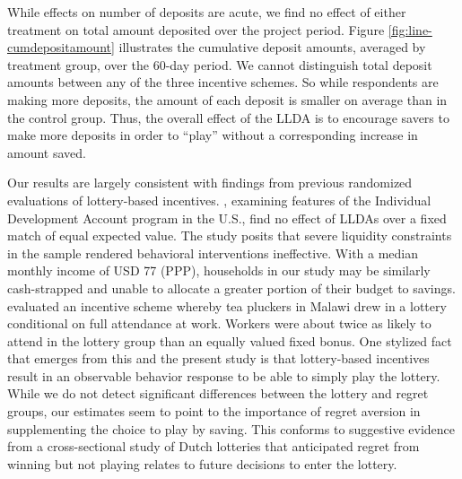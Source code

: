 \documentclass[10pt]{article}
\begin{document}
		While effects on number of deposits are acute, we find no effect of either treatment on total amount deposited over the project period. Figure \ref{fig:line-cumdepositamount} illustrates the cumulative deposit amounts, averaged by treatment group, over the 60-day period. We cannot distinguish total deposit amounts between any of the three incentive schemes. So while respondents are making more deposits, the amount of each deposit is smaller on average than in the control group. Thus, the overall effect of the LLDA is to encourage savers to make more deposits in order to ``play'' without a corresponding increase in amount saved.

		Our results are largely consistent with findings from previous randomized evaluations of lottery-based incentives. , examining features of the Individual Development Account program in the U.S., find no effect of LLDAs over a fixed match of equal expected value. The study posits that severe liquidity constraints in the sample rendered behavioral interventions ineffective. With a median monthly income of USD 77 (PPP), households in our study may be similarly cash-strapped and unable to allocate a greater portion of their budget to savings.  evaluated an incentive scheme whereby tea pluckers in Malawi drew in a lottery conditional on full attendance at work. Workers were about twice as likely to attend in the lottery group than an equally valued fixed bonus. One stylized fact that emerges from this and the present study is that lottery-based incentives result in an observable behavior response to be able to simply play the lottery. While we do not detect significant differences between the lottery and regret groups, our estimates seem to point to the importance of regret aversion in supplementing the choice to play by saving. This conforms to suggestive evidence from a cross-sectional study of Dutch lotteries that anticipated regret from winning but not playing relates to future decisions to enter the lottery. 
\end{document}
